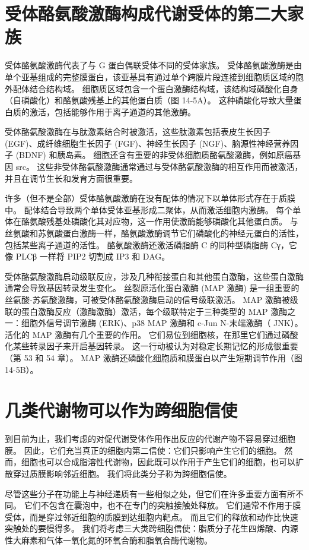 \section{受体酪氨酸激酶构成代谢受体的第二大家族}

受体酪氨酸激酶代表了与 G 蛋白偶联受体不同的受体家族。 受体酪氨酸激酶是由单个亚基组成的完整膜蛋白，该亚基具有通过单个跨膜片段连接到细胞质区域的胞外配体结合结构域。 细胞质区域包含一个蛋白激酶结构域，该结构域磷酸化自身（自磷酸化）和酪氨酸残基上的其他蛋白质（图 14-5A）。 这种磷酸化导致大量蛋白质的激活，包括能够作用于离子通道的其他激酶。

受体酪氨酸激酶在与肽激素结合时被激活，这些肽激素包括表皮生长因子 (EGF)、成纤维细胞生长因子 (FGF)、神经生长因子 (NGF)、脑源性神经营养因子 (BDNF) 和胰岛素。 细胞还含有重要的非受体细胞质酪氨酸激酶，例如原癌基因 src。 这些非受体酪氨酸激酶通常通过与受体酪氨酸激酶的相互作用而被激活，并且在调节生长和发育方面很重要。

许多（但不是全部）受体酪氨酸激酶在没有配体的情况下以单体形式存在于质膜中。 配体结合导致两个单体受体亚基形成二聚体，从而激活细胞内激酶。 每个单体在酪氨酸残基处磷酸化其对应物，这一作用使激酶能够磷酸化其他蛋白质。 与丝氨酸和苏氨酸蛋白激酶一样，酪氨酸激酶调节它们磷酸化的神经元蛋白的活性，包括某些离子通道的活性。 酪氨酸激酶还激活磷脂酶 C 的同种型磷脂酶 Cγ，它像 PLCβ 一样将 PIP2 切割成 IP3 和 DAG。

受体酪氨酸激酶启动级联反应，涉及几种衔接蛋白和其他蛋白激酶，这些蛋白激酶通常会导致基因转录发生变化。 丝裂原活化蛋白激酶 (MAP 激酶) 是一组重要的丝氨酸-苏氨酸激酶，可被受体酪氨酸激酶启动的信号级联激活。 MAP 激酶被级联的蛋白激酶反应（激酶激酶）激活，每个级联特定于三种类型的 MAP 激酶之一：细胞外信号调节激酶 (ERK)、p38 MAP 激酶和 c-Jun N-末端激酶（ JNK）。 活化的 MAP 激酶有几个重要的作用。 它们易位到细胞核，在那里它们通过磷酸化某些转录因子来开启基因转录。 这一行动被认为对稳定长期记忆的形成很重要（第 53 和 54 章）。 MAP 激酶还磷酸化细胞质和膜蛋白以产生短期调节作用（图 14-5B）。

\section{几类代谢物可以作为跨细胞信使}

到目前为止，我们考虑的对促代谢受体作用作出反应的代谢产物不容易穿过细胞膜。 因此，它们充当真正的细胞内第二信使：它们只影响产生它们的细胞。 然而，细胞也可以合成脂溶性代谢物，因此既可以作用于产生它们的细胞，也可以扩散穿过质膜影响邻近细胞。 我们将此类分子称为跨细胞信使。

尽管这些分子在功能上与神经递质有一些相似之处，但它们在许多重要方面有所不同。 它们不包含在囊泡中，也不在专门的突触接触处释放。 它们通常不作用于膜受体，而是穿过邻近细胞的质膜到达细胞内靶点。 而且它们的释放和动作比快速突触处的要慢得多。 我们将考虑三大类跨细胞信使：脂质分子花生四烯酸、内源性大麻素和气体一氧化氮的环氧合酶和脂氧合酶代谢物。

